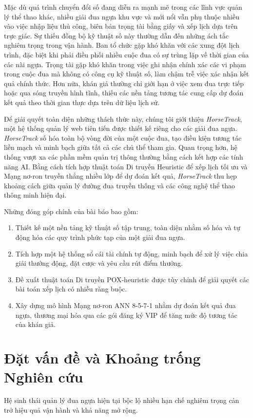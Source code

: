 \documentclass{llncs}
\begin{document}
Mặc dù quá trình chuyển đổi số đang diễn ra mạnh mẽ trong các lĩnh vực quản lý thể thao khác, nhiều giải đua ngựa khu vực và mới nổi vẫn phụ thuộc nhiều vào việc nhập liệu thủ công, biên bản trọng tài bằng giấy và xếp lịch dựa trên trực giác. Sự thiếu đồng bộ kỹ thuật số này thường dẫn đến những ách tắc nghiêm trọng trong vận hành. Ban tổ chức gặp khó khăn với các xung đột lịch trình, đặc biệt khi phải điều phối nhiều cuộc đua có sự trùng lặp về thời gian của các nài ngựa. Trọng tài gặp khó khăn trong việc ghi nhận chính xác các vi phạm trong cuộc đua mà không có công cụ kỹ thuật số, làm chậm trễ việc xác nhận kết quả chính thức. Hơn nữa, khán giả thường chỉ giới hạn ở việc xem đua trực tiếp hoặc qua sóng truyền hình tĩnh, thiếu các nền tảng tương tác cung cấp dự đoán kết quả theo thời gian thực dựa trên dữ liệu lịch sử.

Để giải quyết toàn diện những thách thức này, chúng tôi giới thiệu \textit{HorseTrack}, một hệ thống quản lý web tiên tiến được thiết kế riêng cho các giải đua ngựa. \textit{HorseTrack} số hóa toàn bộ vòng đời của một cuộc đua, tạo điều kiện tương tác liền mạch và minh bạch giữa tất cả các chủ thể tham gia. Quan trọng hơn, hệ thống vượt xa các phần mềm quản trị thông thường bằng cách kết hợp các tính năng AI. Bằng cách tích hợp thuật toán Di truyền Heuristic để xếp lịch tối ưu và Mạng nơ-ron truyền thẳng nhiều lớp để dự đoán kết quả, \textit{HorseTrack} thu hẹp khoảng cách giữa quản lý đường đua truyền thống và các công nghệ thể thao thông minh hiện đại.

Những đóng góp chính của bài báo bao gồm:
\begin{enumerate}
    \item Thiết kế một nền tảng kỹ thuật số tập trung, toàn diện nhằm số hóa và tự động hóa các quy trình phức tạp của một giải đua ngựa.
    \item Tích hợp một hệ thống sổ cái tài chính tự động, minh bạch để xử lý việc chia giải thưởng động, đặt cược và yêu cầu rút điểm thưởng.
    \item Đề xuất thuật toán Di truyền POX-heuristic được tùy chỉnh để giải quyết các bài toán xếp lịch có nhiều ràng buộc.
    \item Xây dựng mô hình Mạng nơ-ron ANN 8-5-7-1 nhằm dự đoán kết quả đua ngựa, thương mại hóa qua các gói đăng ký VIP để tăng mức độ tương tác của khán giả.
\end{enumerate}

\section{Đặt vấn đề và Khoảng trống Nghiên cứu}
Hệ sinh thái quản lý đua ngựa hiện tại bộc lộ nhiều hạn chế nghiêm trọng cản trở hiệu quả vận hành và khả năng mở rộng.
\end{document}
